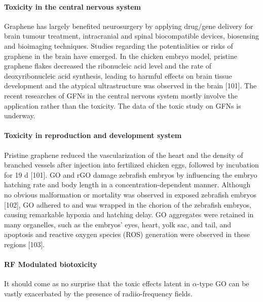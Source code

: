 \documentclass[twoside,twocolumn,9pt]{article}
\begin{document}
\paragraph{Toxicity in the central nervous system} Graphene has largely benefited neurosurgery by applying drug/gene delivery for brain tumour treatment, intracranial and spinal biocompatible devices, biosensing and bioimaging techniques. Studies regarding the potentialities or risks of graphene in the brain have emerged. In the chicken embryo model, pristine graphene flakes decreased the ribonucleic acid level and the rate of deoxyribonucleic acid synthesis, leading to harmful effects on brain tissue development and the atypical ultrastructure was observed in the brain [101]. The recent researches of GFNs in the central nervous system mostly involve the application rather than the toxicity. The data of the toxic study on GFNs is underway.

\paragraph{Toxicity in reproduction and development system} Pristine graphene reduced the vascularization of the heart and the density of branched vessels after injection into fertilized chicken eggs, followed by incubation for 19 d [101]. GO and rGO damage zebrafish embryos by influencing the embryo hatching rate and body length in a concentration-dependent manner. Although no obvious malformation or mortality was observed in exposed zebrafish embryos [102], GO adhered to and was wrapped in the chorion of the zebrafish embryos, causing remarkable hypoxia and hatching delay. GO aggregates were retained in many organelles, such as the embryos' eyes, heart, yolk sac, and tail, and apoptosis and reactive oxygen species (ROS) generation were observed in these regions [103].

\paragraph{RF Modulated biotoxicity} It should come as no surprise that the toxic effects latent in $\alpha$-type GO can be vastly exacerbated by the presence of radiio-frequency fields. 
\end{document}
